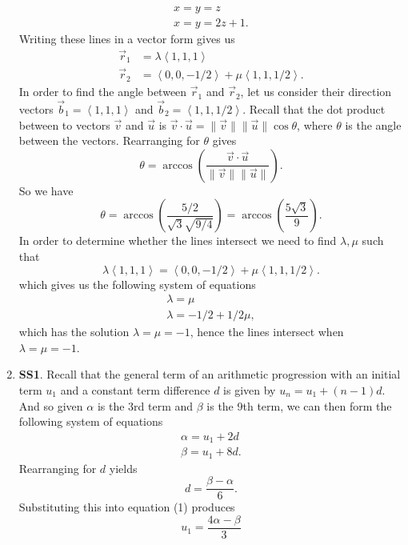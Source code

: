 \documentclass[12pt,oneside]{book}
\begin{document}
\begin{enumerate}
\begin{align*}
            x = y = z \\
            x = y = 2z + 1.
        \end{align*}
        Writing these lines in a vector form gives us \begin{align*}
            \vec{r}_1 &= \lambda \left\langle 1, 1, 1 \right\rangle \\
            \vec{r}_2 &= \left\langle 0, 0, -1/2 \right\rangle + \mu \left\langle 1, 1, 1/2 \right\rangle.
        \end{align*}
        In order to find the angle between $\vec{r}_1$ and $\vec{r}_2$, let us consider their direction vectors $\vec{b}_1 = \left\langle 1,1,1 \right\rangle$ and $\vec{b}_2 = \left\langle 1,1,1/2 \right\rangle$. Recall that the dot product between to vectors $\vec{v}$ and $\vec{u}$ is $\vec{v} \cdot \vec{u} = \| \vec{v} \| \| \vec{u} \| \cos \theta$, where $\theta$ is the angle between the vectors. Rearranging for $\theta$ gives \[
            \theta = \arccos \left( \frac{\vec{v} \cdot \vec{u}}{\| \vec{v} \| \| \vec{u} \|} \right)
        .\] 
        So we have \[
            \theta = \arccos \left( \frac{5/2}{\sqrt{3} \sqrt{9/4} } \right) = \arccos \left( \frac{5 \sqrt{3}}{9} \right)
        .\] 
        In order to determine whether the lines intersect we need to find $\lambda, \mu$ such that \[
            \lambda \left\langle 1,1,1 \right\rangle = \left\langle 0,0,-1/2 \right\rangle + \mu \left\langle 1,1,1/2 \right\rangle
        .\] which gives us the following system of equations \begin{align*}
            \lambda = \mu \\
            \lambda = -1/2 + 1/2 \mu,
        \end{align*}
        which has the solution $\lambda = \mu = -1$, hence the lines intersect when $\lambda = \mu = -1$.
        \item \textbf{SS1}. Recall that the general term of an arithmetic progression with an initial term $u_1$ and a constant term difference $d$ is given by $u_n = u_1 + (n-1)d$. And so given $\alpha$ is the 3rd term and $\beta$ is the 9th term, we can then form the following system of equations \begin{align*}
            \alpha = u_1 + 2d \\
            \beta = u_1 + 8d.
        \end{align*}
        Rearranging for $d$ yields \[
            d = \frac{\beta - \alpha}{6}
        .\] Substituting this into equation (1) produces \[
            u_1 = \frac{4 \alpha - \beta}{3}
\]
\end{enumerate}
\end{document}
